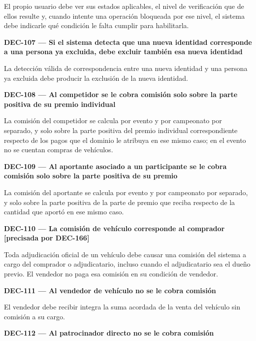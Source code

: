 \documentclass[10pt,letterpaper]{article}
\begin{document}
El propio usuario debe ver sus estados aplicables, el nivel de verificación que de ellos resulte y, cuando intente una operación bloqueada por ese nivel, el sistema debe indicarle qué condición le falta cumplir para habilitarla.\par\vspace{0.45em}
\noindent\textbf{DEC-107 --- Si el sistema detecta que una nueva identidad corresponde a una persona ya excluida, debe excluir también esa nueva identidad}\par
La detección válida de correspondencia entre una nueva identidad y una persona ya excluida debe producir la exclusión de la nueva identidad.\par\vspace{0.45em}
\noindent\textbf{DEC-108 --- Al competidor se le cobra comisión solo sobre la parte positiva de su premio individual}\par
La comisión del competidor se calcula por evento y por campeonato por separado, y solo sobre la parte positiva del premio individual correspondiente respecto de los pagos que el dominio le atribuya en ese mismo caso; en el evento no se cuentan compras de vehículos.\par\vspace{0.45em}
\noindent\textbf{DEC-109 --- Al aportante asociado a un participante se le cobra comisión solo sobre la parte positiva de su premio}\par
La comisión del aportante se calcula por evento y por campeonato por separado, y solo sobre la parte positiva de la parte de premio que reciba respecto de la cantidad que aportó en ese mismo caso.\par\vspace{0.45em}
\noindent\textbf{DEC-110 --- La comisión de vehículo corresponde al comprador [precisada por DEC-166]}\par
Toda adjudicación oficial de un vehículo debe causar una comisión del sistema a cargo del comprador o adjudicatario, incluso cuando el adjudicatario sea el dueño previo. El vendedor no paga esa comisión en su condición de vendedor.\par\vspace{0.45em}
\noindent\textbf{DEC-111 --- Al vendedor de vehículo no se le cobra comisión}\par
El vendedor debe recibir integra la suma acordada de la venta del vehículo sin comisión a su cargo.\par\vspace{0.45em}
\noindent\textbf{DEC-112 --- Al patrocinador directo no se le cobra comisión}\par
\end{document}
